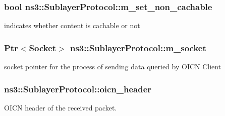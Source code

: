 \hypertarget{classns3_1_1SublayerProtocol_a829d9ef293fd6c38367143c338850cb7}{
\subsubsection[{m\-\_\-set\-\_\-non\-\_\-cachable}]{\setlength{\rightskip}{0pt plus 5cm}bool ns3\-::\-Sublayer\-Protocol\-::m\-\_\-set\-\_\-non\-\_\-cachable\hspace{0.3cm}{\ttfamily [private]}}}\label{classns3_1_1SublayerProtocol_a829d9ef293fd6c38367143c338850cb7}


indicates whether content is cachable or not 

\hypertarget{classns3_1_1SublayerProtocol_a6fb3c36f156ba315448ef4fe95a3c4f6}{
\subsubsection[{m\-\_\-socket}]{\setlength{\rightskip}{0pt plus 5cm}Ptr$<$Socket$>$ ns3\-::\-Sublayer\-Protocol\-::m\-\_\-socket\hspace{0.3cm}{\ttfamily [private]}}}\label{classns3_1_1SublayerProtocol_a6fb3c36f156ba315448ef4fe95a3c4f6}


socket pointer for the process of sending data queried by O\-I\-C\-N Client 

\hypertarget{classns3_1_1SublayerProtocol_a9ceec600a64150a12295c82f01bb8e3c}{
\subsubsection[{oicn\-\_\-header}]{ ns3\-::\-Sublayer\-Protocol\-::oicn\-\_\-header\hspace{0.3cm}{\ttfamily [private]}}}\label{classns3_1_1SublayerProtocol_a9ceec600a64150a12295c82f01bb8e3c}


O\-I\-C\-N header of the received packet. 


